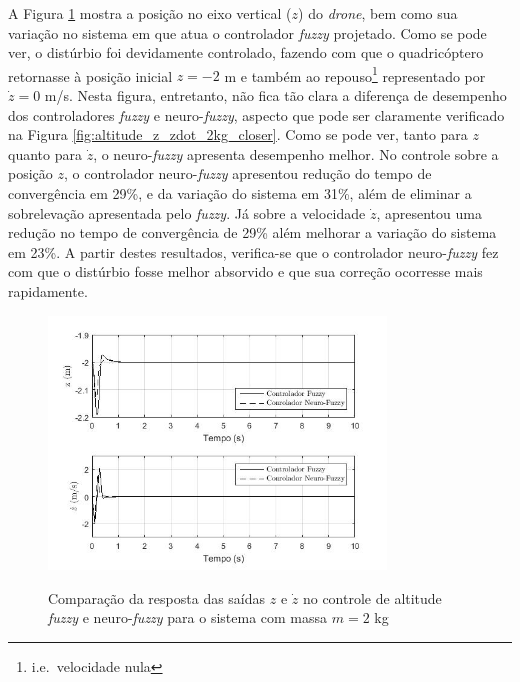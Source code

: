 A Figura \ref{fig:altitude_z_zdot_2kg} mostra a posição no eixo vertical ($z$) do \textit{drone}, bem como sua variação no sistema em que atua o controlador \textit{fuzzy} projetado. Como se pode ver, o distúrbio foi devidamente controlado, fazendo com que o quadricóptero retornasse à posição inicial $z=-2$ m e também ao repouso\footnote{i.e.\ velocidade nula} representado por $\dot{z}=0$ m/s. Nesta figura, entretanto, não fica tão clara a diferença de desempenho dos controladores \textit{fuzzy} e neuro-\textit{fuzzy}, aspecto que pode ser claramente verificado na Figura \ref{fig:altitude_z_zdot_2kg_closer}. Como se pode ver, tanto para $z$ quanto para $\dot{z}$, o neuro-\textit{fuzzy} apresenta desempenho melhor. No controle sobre a posição $z$, o controlador neuro-\textit{fuzzy} apresentou redução do tempo de convergência em 29\%, e da variação do sistema em 31\%, além de eliminar a sobrelevação apresentada pelo \textit{fuzzy}. Já sobre a velocidade $\dot{z}$, apresentou uma redução no tempo de convergência de 29\% além melhorar a variação do sistema em 23\%. A partir destes resultados, verifica-se que o controlador neuro-\textit{fuzzy} fez com que o distúrbio fosse melhor absorvido e que sua correção ocorresse mais rapidamente.

\begin{figure}[!htb]
    \centering
    \caption{Comparação da resposta das saídas $z$ e $\dot{z}$ no controle de altitude \textit{fuzzy} e neuro-\textit{fuzzy} para o sistema com massa $m=2$ kg}
    \includegraphics[width=0.8\textwidth]{./04-figuras/figuras_pos_banca/5-altitude2kg/graph_z_zdot_2kg}
    \label{fig:altitude_z_zdot_2kg}
\end{figure}

